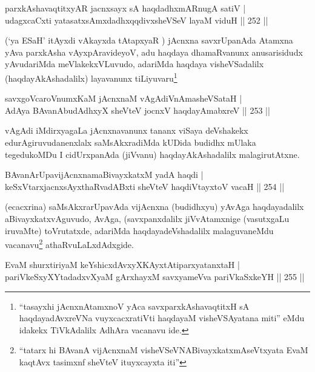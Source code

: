 \begin{shl}
parxkAshavaqtitxyAR jacnxsayx sA haqdadhxmARnugA satiV |\\
udagxcaCxti yatasatxsAmxdadhxqqdivxsheVSeV layaM viduH \hfill || 252 ||
\end{shl}

\begin{artha}
(`ya ESaH' itAyxdi vAkayxda tAtapxyaR  \mdash ) jAcnxna savxrUpanAda Atamxna yAva parxkAsha vAyxpAravideyoV, adu haqdaya dhamaRvanunx anusarisidudx yAvudariMda meVlakekxVLuvudo, adariMda haqdaya visheVSadalilx (haqdayAkAshadalilx) layavanunx tiLiyuvaru\footnote{``tasayxhi jAcnxnAtamxnoV yAca savxparxkAshavaqtitxH sA haqdayadAvxreVNa vuyxcacxratiVti haqdayaM visheVSAyatana miti'' eMdu idakekx TiVkAdalilx AdhAra vacanavu ide.}
\end{artha}

\begin{shl}
savxgoVcaroVnumxKaM jAcnxnaM vAgAdiVnAmasheVSataH |\\
AdAya BAvanAbudAdhxyX sheVteV jocnxV haqdayAmabxreV \hfill || 253 ||
\end{shl}

\begin{artha}
vAgAdi iMdirxyagaLa jAcnxnavanunx tananx viSaya deVshakekx edurAgiruvudanenxlalx saMsAkxradiMda kUDida budidhx mUlaka tegedukoMDu I cidUrxpanAda (jiVvanu) haqdayAkAshadalilx malagirutAtxne.
\end{artha}

\begin{shl}
BAvanArUpavijAcnxnamaBivayxkatxM yadA haqdi |\\
keSxVtarxjacnxsAyxthaRvadABxti sheVteV haqdiVtayxtoV vacaH \hfill || 254 ||
\end{shl}

\begin{artha}
(ecacxrina) saMsAkxrarUpavAda vijAcnxna (budidhxyu) yAvAga haqdayadalilx aBivayxkatxvAguvudo, AvAga, (savxpanxdalilx jiVvAtamxnige (vasutxgaLu iruvaMte) toVrutatxde, adariMda haqdayadeVshadalilx malaguvaneMdu vacanavu\footnote{``tatarx hi BAvanA vijAcnxnaM visheVSeVNABivayxkatxmAseVtxyata EvaM kaqtAvx tasimxnf sheVteV ituyxcayxta  iti''} athaRvuLaLxdAdxgide.
\end{artha}


\begin{shl}
EvaM shurxtiriyaM keYshicxdAvxyXKAyxtA\s tiparxyatanxtaH |\\
pariVkeSxyXYtadadxvXyaM gArxhayxM savxyameVva pariVkaSxkeYH \hfill || 255 ||
\end{shl}

